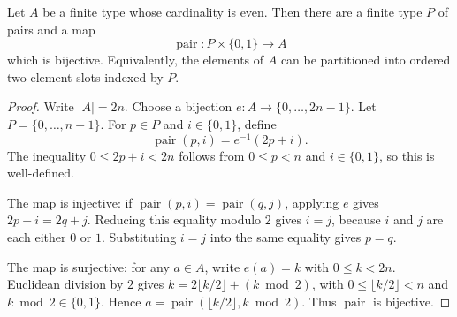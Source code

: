 \begin{helper}
Let $A$ be a finite type whose cardinality is even.  Then there are a
finite type $P$ of pairs and a map
\[
  \operatorname{pair}:P\times\{0,1\}\to A
\]
which is bijective.  Equivalently, the elements of $A$ can be partitioned
into ordered two-element slots indexed by $P$.
\end{helper}
\begin{proof}
Write $|A|=2n$.  Choose a bijection $e:A\to\{0,\ldots,2n-1\}$.  Let
$P=\{0,\ldots,n-1\}$.  For $p\in P$ and $i\in\{0,1\}$, define
\[
  \operatorname{pair}(p,i)=e^{-1}(2p+i).
\]
The inequality $0\le 2p+i<2n$ follows from $0\le p<n$ and
$i\in\{0,1\}$, so this is well-defined.

The map is injective: if
$\operatorname{pair}(p,i)=\operatorname{pair}(q,j)$, applying $e$ gives
$2p+i=2q+j$.  Reducing this equality modulo $2$ gives $i=j$, because
$i$ and $j$ are each either $0$ or $1$.  Substituting $i=j$ into the same
equality gives $p=q$.

The map is surjective: for any $a\in A$, write $e(a)=k$ with
$0\le k<2n$.  Euclidean division by $2$ gives
$k=2\lfloor k/2\rfloor+(k\bmod 2)$, with
$0\le \lfloor k/2\rfloor<n$ and $k\bmod 2\in\{0,1\}$.  Hence
$a=\operatorname{pair}(\lfloor k/2\rfloor,k\bmod 2)$.  Thus
$\operatorname{pair}$ is bijective.
\end{proof}

